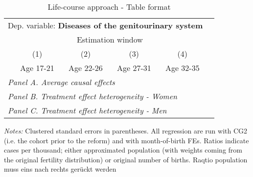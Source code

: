  \begin{table}[H] \centering \begin{threeparttable} \caption{Life-course approach - Table format} {\def\sym#1{\ifmmode^{#1}\else\(^{#1}\)\fi} \begin{tabular}{l*{5}{c}} \toprule \multicolumn{5}{l}{Dep. variable: \textbf{Diseases of the genitourinary system}} \\ & \multicolumn{4}{c}{Estimation window} \\ \cmidrule(lr){2-5}
            &\multicolumn{1}{c}{(1)}&\multicolumn{1}{c}{(2)}&\multicolumn{1}{c}{(3)}&\multicolumn{1}{c}{(4)}\\
            &\multicolumn{1}{c}{Age 17-21}&\multicolumn{1}{c}{Age 22-26}&\multicolumn{1}{c}{Age 27-31}&\multicolumn{1}{c}{Age 32-35}\\
\midrule
 \multicolumn{5}{l}{\emph{Panel A. Average causal effects}} \\      \midrule\multicolumn{5}{l}{\emph{Panel B. Treatment effect heterogeneity - Women}} \\      \midrule\multicolumn{5}{l}{\emph{Panel C. Treatment effect heterogeneity - Men}} \\      
\bottomrule \end{tabular} } \begin{tablenotes} \item \scriptsize \emph{Notes:} Clustered standard errors in parentheses. All regression are run with CG2 (i.e. the cohort prior to the reform) and with month-of-birth FEs. Ratios indicate cases per thousand; either approximated population (with weights coming from the original fertility distribution) or original number of births. Raqtio population muss eins nach rechts gerückt werden \end{tablenotes} \end{threeparttable} \end{table} 
